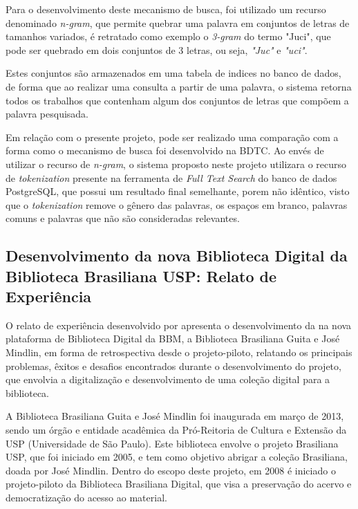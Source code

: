 Para o desenvolvimento deste mecanismo de busca, foi utilizado
um recurso denominado \emph{n-gram}, que permite quebrar uma palavra em
conjuntos de letras de tamanhos variados, é retratado como exemplo o
\emph{3-gram} do termo "Juci", que pode ser quebrado em dois conjuntos de 3
letras, ou seja, \emph{"Juc"} e \emph{"uci"}.

Estes conjuntos são armazenados em uma tabela de indices no banco de
dados, de forma que ao realizar uma consulta a partir de uma palavra,
o sistema retorna todos os trabalhos que contenham algum dos conjuntos
de letras que compõem a palavra pesquisada.

Em relação com o presente projeto, pode ser realizado uma comparação com
a forma como o mecanismo de busca foi desenvolvido na BDTC. Ao envés de
utilizar o recurso de \emph{n-gram}, o sistema proposto neste projeto utilizara
o recurso de \emph{tokenization} presente na ferramenta de \emph{Full Text Search} do
banco de dados PostgreSQL, que possui um resultado final semelhante, porem não
idêntico, visto que o \emph{tokenization} remove o gênero das palavras,
os espaços em branco, palavras comuns e palavras que não são consideradas relevantes.

\subsection{Desenvolvimento da nova Biblioteca Digital da Biblioteca Brasiliana USP: Relato de Experiência}

O relato de experiência desenvolvido por \cite{GarciaRodrigoMoreira2019DdnB}
apresenta o desenvolvimento da na nova plataforma de Biblioteca Digital da
BBM, a Biblioteca Brasiliana Guita e José Mindlin, em forma de retrospectiva
desde o projeto-piloto, relatando os principais problemas, êxitos
e desafios encontrados durante o desenvolvimento do projeto, que envolvia
a digitalização e desenvolvimento de uma coleção digital para a biblioteca.

A Biblioteca Brasiliana Guita e José Mindlin foi inaugurada em março
de 2013, sendo um órgão e entidade acadêmica da Pró-Reitoria de Cultura
e Extensão da USP (Universidade de São Paulo). Este biblioteca envolve o
projeto Brasiliana USP, que foi iniciado em 2005, e tem como objetivo
abrigar a coleção Brasiliana, doada por José Mindlin. Dentro do escopo
deste projeto, em 2008 é iniciado o projeto-piloto da Biblioteca
Brasiliana Digital, que visa a preservação do acervo e democratização
do acesso ao material.


